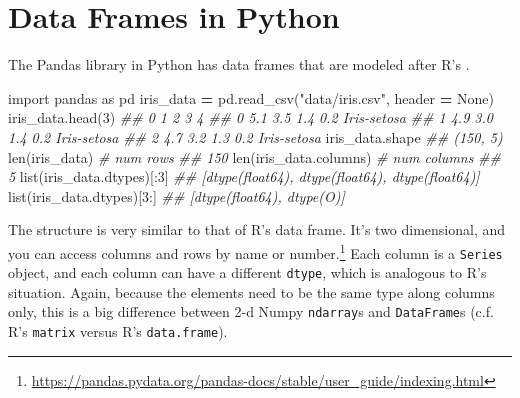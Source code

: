 \documentclass[
  12pt,
  krantz2]{krantz}
\makeatletter
\newenvironment{Shaded}{\begin{snugshade}}{\end{snugshade}}
\newcommand{\BuiltInTok}[1]{#1}
\newcommand{\CommentTok}[1]{\textcolor[rgb]{0.37,0.37,0.37}{\textit{#1}}}
\newcommand{\DecValTok}[1]{\textcolor[rgb]{0.06,0.06,0.06}{#1}}
\newcommand{\ImportTok}[1]{#1}
\newcommand{\NormalTok}[1]{#1}
\newcommand{\OperatorTok}[1]{\textcolor[rgb]{0.43,0.43,0.43}{\textbf{#1}}}
\newcommand{\StringTok}[1]{\textcolor[rgb]{0.5,0.5,0.5}{#1}}
\newcommand{\VariableTok}[1]{\textcolor[rgb]{0,0,0}{#1}}
\renewcommand{\href}[2]{#2\footnote{\url{#1}}}
\newenvironment{kframe}{%
\medskip{}
\setlength{\fboxsep}{.8em}
 \def\at@end@of@kframe{}%
 \ifinner\ifhmode%
  \def\at@end@of@kframe{\end{minipage}}%
  \begin{minipage}{\columnwidth}%
 \fi\fi%
 \def\FrameCommand##1{\hskip\@totalleftmargin \hskip-\fboxsep
 \colorbox{shadecolor}{##1}\hskip-\fboxsep
     \hskip-\linewidth \hskip-\@totalleftmargin \hskip\columnwidth}%
 \MakeFramed {\advance\hsize-\width
   \@totalleftmargin\z@ \linewidth\hsize
   \@setminipage}}%
 {\par\unskip\endMakeFramed%
 \at@end@of@kframe}
\renewenvironment{Shaded}{\begin{kframe}}{\end{kframe}}
\makeatother
\begin{document}
\hypertarget{data-frames-in-python}{%
\section{Data Frames in Python}\label{data-frames-in-python}}

The Pandas library in Python has data frames that are modeled after R's \citep{pandas_guy}.

\begin{Shaded}
\begin{Highlighting}[]
\ImportTok{import}\NormalTok{ pandas }\ImportTok{as}\NormalTok{ pd}
\NormalTok{iris\_data }\OperatorTok{=}\NormalTok{ pd.read\_csv(}\StringTok{"data/iris.csv"}\NormalTok{, header }\OperatorTok{=} \VariableTok{None}\NormalTok{)}
\NormalTok{iris\_data.head(}\DecValTok{3}\NormalTok{)}
\CommentTok{\#\#      0    1    2    3            4}
\CommentTok{\#\# 0  5.1  3.5  1.4  0.2  Iris{-}setosa}
\CommentTok{\#\# 1  4.9  3.0  1.4  0.2  Iris{-}setosa}
\CommentTok{\#\# 2  4.7  3.2  1.3  0.2  Iris{-}setosa}
\NormalTok{iris\_data.shape}
\CommentTok{\#\# (150, 5)}
\BuiltInTok{len}\NormalTok{(iris\_data) }\CommentTok{\# num rows}
\CommentTok{\#\# 150}
\BuiltInTok{len}\NormalTok{(iris\_data.columns) }\CommentTok{\# num columns}
\CommentTok{\#\# 5}
\BuiltInTok{list}\NormalTok{(iris\_data.dtypes)[:}\DecValTok{3}\NormalTok{]}
\CommentTok{\#\# [dtype(\textquotesingle{}float64\textquotesingle{}), dtype(\textquotesingle{}float64\textquotesingle{}), dtype(\textquotesingle{}float64\textquotesingle{})]}
\BuiltInTok{list}\NormalTok{(iris\_data.dtypes)[}\DecValTok{3}\NormalTok{:]}
\CommentTok{\#\# [dtype(\textquotesingle{}float64\textquotesingle{}), dtype(\textquotesingle{}O\textquotesingle{})]}
\end{Highlighting}
\end{Shaded}

The structure is very similar to that of R's data frame. It's two dimensional, and you can \href{https://pandas.pydata.org/pandas-docs/stable/user_guide/indexing.html}{access columns and rows by name or number.} Each column is a \texttt{Series} object, and each column can have a different \texttt{dtype}, which is analogous to R's situation. Again, because the elements need to be the same type along columns only, this is a big difference between 2-d Numpy \texttt{ndarray}s and \texttt{DataFrame}s (c.f. R's \texttt{matrix} versus R's \texttt{data.frame}).
\end{document}
